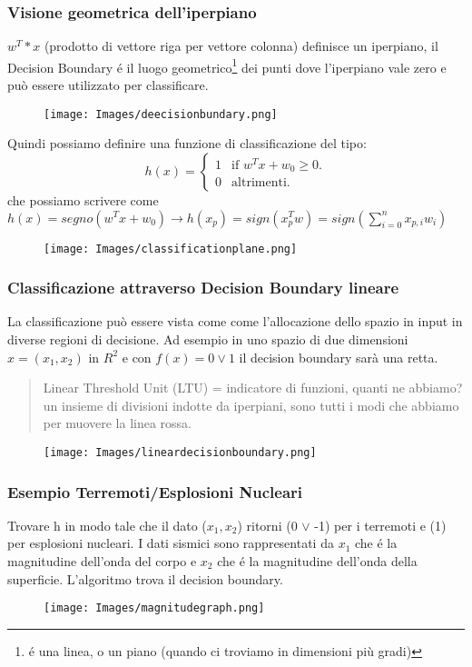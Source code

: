 \documentclass{article}
\begin{document}
\subsubsection{Visione geometrica dell'iperpiano}
$w^T*x$ (prodotto di vettore riga per vettore colonna) definisce un iperpiano, il Decision Boundary é il luogo geometrico\footnote{é una linea, o un piano (quando ci troviamo in dimensioni più gradi)} dei punti dove l'iperpiano vale zero e può essere utilizzato per classificare.
\begin{figure}[H]
\centering
\texttt{[image: Images/deecisionbundary.png]}
\end{figure}
Quindi possiamo definire una funzione di classificazione del tipo:
\begin{equation}
  h(x)=\begin{cases}
    1 & \text{if $w^Tx+w_0\geq 0$}.\\
    0 & \text{altrimenti}.
  \end{cases}
\end{equation}
che possiamo scrivere come $h(x)=segno(w^Tx+w_0) \rightarrow h(x_p)=sign(x_p^Tw)=sign(\sum_{i=0}^n x_{p,i}w_i)$
\begin{figure}[H]
\centering
\texttt{[image: Images/classificationplane.png]}
\end{figure}

\subsubsection{Classificazione attraverso Decision Boundary lineare}
La classificazione può essere vista come come l'allocazione dello spazio in input in diverse regioni di decisione. Ad esempio in uno spazio di due dimensioni $x=(x_1,x_2)$ in $R^2$ e con $f(x) = 0 \lor 1$ il decision boundary sarà una retta. 
\begin{quote}
    Linear Threshold Unit (LTU) = indicatore di funzioni, quanti ne abbiamo? un insieme di divisioni indotte da iperpiani, sono tutti i modi che abbiamo per muovere la linea rossa.
\end{quote}
\begin{figure}[H]
\centering
\texttt{[image: Images/lineardecisionboundary.png]}
\end{figure}

\subsubsection{Esempio Terremoti/Esplosioni Nucleari}
Trovare h in modo tale che il dato ($x_1, x_2$) ritorni (0 $\lor$ -1) per i terremoti e (1) per esplosioni nucleari. I dati sismici sono rappresentati da $x_1$ che é la magnitudine dell'onda del corpo e $x_2$ che é la magnitudine dell'onda della superficie. L'algoritmo trova il decision boundary.
\begin{figure}[H]
\centering
\texttt{[image: Images/magnitudegraph.png]}
\end{figure}
\end{document}

